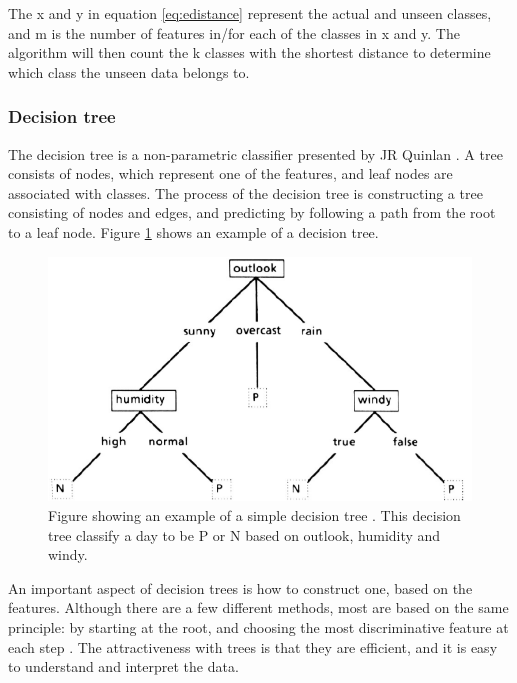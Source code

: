 \documentclass[USenglish]{ifimaster}  %
\begin{document}
The x and y in equation \ref{eq:edistance} represent the actual and unseen classes, and m is the number of features in/for each of the classes in x and y. The algorithm will then count the k classes with the shortest distance to determine which class the unseen data belongs to.
	
	
\subsubsection{Decision tree}
The decision tree is a non-parametric classifier presented by JR Quinlan \cite{Quinlan1986}. A tree consists of nodes, which represent one of the features, and leaf nodes are associated with classes. The process of the decision tree is constructing a tree consisting of nodes and edges, and predicting by following a path from the root to a leaf node. Figure \ref{fig:decisiontree} shows an example of a decision tree.


	
\begin{figure}[h]
		\centering
		\includegraphics[scale=0.5]{Figures/decisionTree.PNG}
		\caption{Figure showing an example of a simple decision tree \cite{Quinlan1986}. This decision tree classify a day to be P or N based on outlook, humidity and windy.}
		\label{fig:decisiontree}
\end{figure}
\FloatBarrier

An important aspect of decision trees is how to construct one, based on the features. Although there are a few different methods, most are based on the same principle: by starting at the root, and choosing the most discriminative feature at each step \cite{Marsland:2009:MLA:1571643}. The attractiveness with trees is that they are efficient, and it is easy to understand and interpret the data.
\end{document}
